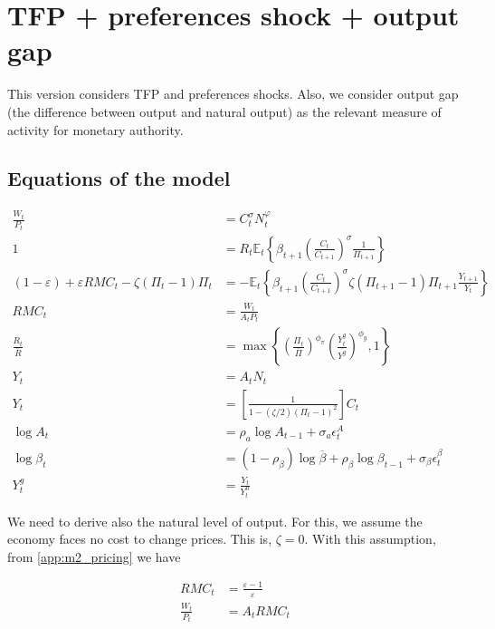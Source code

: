\documentclass[12pt]{article}
\numberwithin{equation}{section}
\begin{document}
\section{TFP + preferences shock + output gap}

This version considers TFP and preferences shocks. Also, we consider output gap (the difference between output and natural output) as the relevant measure of activity for monetary authority.

\subsection{Equations of the model}

\begin{align}
	\frac{W_t}{P_t}&=C_t^{\sigma}N_t^{\varphi}\label{app:m2_intra}\\
	1&=R_t\mathbb{E}_t\left\{\beta_{t+1}\left(\frac{C_t}{C_{t+1}}\right)^{\sigma}\frac{1}{\Pi_{t+1}}\right\}\label{app:m2_euler}\\
	(1-\varepsilon)+\varepsilon RMC_t-\zeta(\Pi_t-1)\Pi_t&=-\mathbb{E}_t\left\{\beta_{t+1}\left(\frac{C_t}{C_{t+1}}\right)^{\sigma}\zeta(\Pi_{t+1}-1)\Pi_{t+1}\frac{Y_{t+1}}{Y_t}\right\}\label{app:m2_pricing}\\
	RMC_t&=\frac{W_t}{A_tP_t}\label{app:m2_rmc}\\
	\frac{R_t}{\overline R}&=\max\left\{\left(\frac{\Pi_t}{\overline\Pi}\right)^{\phi_{\pi}}\left(\frac{Y_t^g}{\overline{Y^g}}\right)^{\phi_{y}},1\right\}\label{app:m2_taylor}\\
	Y_t&=A_tN_t\label{app:m2_product}\\
	Y_t&=\left[\frac{1}{1-(\zeta/2)(\Pi_t-1)^2}\right]C_t\label{app:m2_aggregate}\\
	\log A_t&=\rho_a\log A_{t-1}+\sigma_a\epsilon_t^A\label{app:m2_ar1_a}\\
	\log \beta_t&=(1-\rho_{\beta})\log\overline\beta+\rho_{\beta}\log \beta_{t-1}+\sigma_{\beta}\epsilon_t^{\beta}\label{app:m2_ar1_b}\\
	Y_t^g&=\frac{Y_t}{Y_t^n}\label{app:m2_og}
\end{align}
	
We need to derive also the natural level of output. For this, we assume the economy faces no cost to change prices. This is, $\zeta=0$. With this assumption, from \eqref{app:m2_pricing} we have

\begin{align*}
	RMC_t&=\frac{\varepsilon-1}{\varepsilon}\\
	\frac{W_t}{P_t}&=A_tRMC_t
\end{align*}
\end{document}
